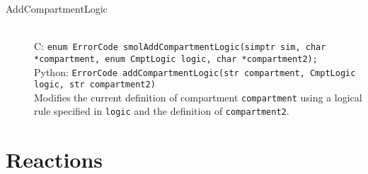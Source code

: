 \documentclass {book}
\begin{document}
\begin{description}
\item[AddCompartmentLogic]
\hfill \\
C: \texttt{enum ErrorCode smolAddCompartmentLogic(simptr sim, char *compartment, enum CmptLogic logic, char *compartment2);}\\
Python: \texttt{ErrorCode addCompartmentLogic(str compartment, CmptLogic logic, str compartment2)}\\
Modifies the current definition of compartment \texttt{compartment} using a logical rule specified in \texttt{logic} and the definition of \texttt{compartment2}.

\end{description}

\section{Reactions}
\end{document}
